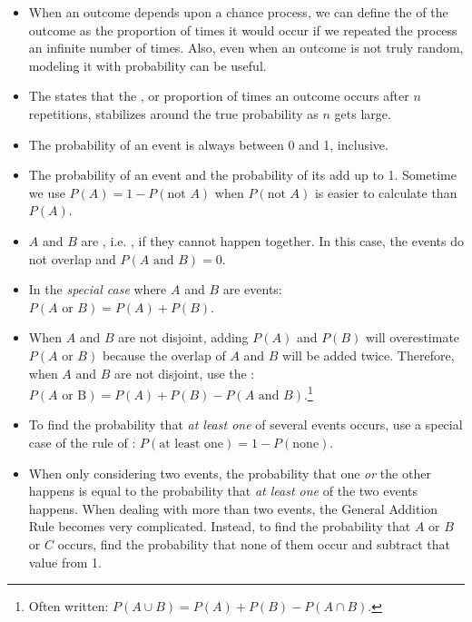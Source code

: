 \begin{itemize}

\item When an outcome depends upon a chance process, we can define the  of the outcome as the proportion of times it would occur if we repeated the process an infinite number of times.  Also, even when an outcome is not truly random, modeling it with probability can be useful.

\item The  states that the , or proportion of times an outcome occurs after $n$ repetitions, stabilizes around the true probability as $n$ gets large.

\item The probability of an event is always between 0 and 1, inclusive.

\item The probability of an event and the probability of its  add up to 1.  Sometime we use $P(A) = 1- P(\text{not } A)$ when $P(\text{not }A)$ is easier to calculate than $P(A)$.

\item $A$ and $B$ are , i.e. , if they cannot happen together.  In this case, the events do not overlap and $P(A \text { and } B) = 0$.

\item In the \emph{special case} where $A$ and $B$ are  events:  $P(A \text{ or } B) = P(A) + P(B)$.  

\item When $A$ and $B$ are not disjoint, adding $P(A)$ and $P(B)$ will overestimate $P(A \text{ or } B)$ because the overlap of $A$ and $B$ will be added twice.  Therefore, when $A$ and $B$ are not disjoint, use the :  \\$P(A \text{ or  B}) = P(A) + P(B) - P(A \text{ and } B)$.\footnote{Often written: $P(A \cup B) = P(A) + P(B) - P(A \cap B)$.} 

\item To find the probability that \emph{at least one} of several events occurs, use a special case of the rule of :  $P(\text{at least one}) = 1- P(\text{none})$.  

\item When only considering two events, the probability that one \emph{or} the other happens is equal to the probability that \emph{at least one} of the two events happens.  When dealing with more than two events, the General Addition Rule becomes very complicated.  Instead, to find the probability that $A$ or $B$ or $C$ occurs, find the probability that none of them occur and subtract that value from 1.  


\end{itemize}
